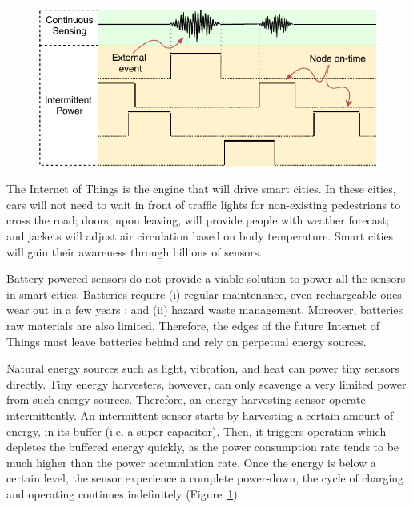 \begin{figure}
	\centering
	\includegraphics[width=\columnwidth]{figures/coalInterSen}
	\caption{\fullsys}
	\label{fig:powerCycle}
\end{figure}

The Internet of Things is the engine that will drive smart cities. In these cities, cars will not need to wait in front of traffic lights for non-existing pedestrians to cross the road; doors, upon leaving, will provide people with weather forecast; and jackets will adjust air circulation based on body temperature. Smart cities will gain their awareness through billions of sensors.

Battery-powered sensors do not provide a viable solution to power all the sensors in smart cities. Batteries require (i) regular maintenance, even rechargeable ones wear out in a few years \cite{xxx}; and (ii) hazard waste management. Moreover, batteries raw materials are also limited. Therefore, the edges of the future Internet of Things must leave batteries behind and rely on perpetual energy sources. 

Natural energy sources such as light, vibration, and heat can power tiny sensors directly. Tiny energy harvesters, however, can only scavenge a very limited power from such energy sources. Therefore, an energy-harvesting sensor operate intermittently. An intermittent sensor starts by harvesting a certain amount of energy, in its buffer (i.e. a super-capacitor). Then, it triggers operation which depletes the buffered energy quickly, as the power consumption rate tends to be much higher than the power accumulation rate. Once the energy is below a certain level, the sensor experience a complete power-down, the cycle of charging and operating continues indefinitely (Figure~\ref{fig:powerCycle}). 

